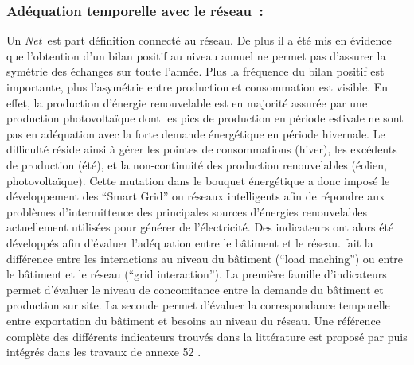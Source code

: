\subsubsection{Adéquation temporelle avec le réseau~:} %
\label{ssub:adequation_temporelle_avec_le_réseau}
Un \textit{Net}\, est part définition connecté au réseau. De plus il a été mis en évidence
que l’obtention d’un bilan positif au niveau annuel ne permet pas d’assurer la
symétrie des échanges sur toute l’année. Plus la fréquence du bilan positif est importante,
plus l’asymétrie entre production et consommation est visible. En effet, la production
d’énergie renouvelable est en majorité assurée par une production photovoltaïque
dont les pics de production en période estivale ne sont pas en adéquation avec la forte demande
énergétique en période hivernale. Le difficulté réside ainsi à gérer les pointes
de consommations (hiver), les excédents de production (été), et la non-continuité
des production renouvelables (éolien, photovoltaïque).
Cette mutation dans le bouquet énergétique a donc imposé le développement des
\enquote{Smart Grid} ou réseaux intelligents afin de répondre aux problèmes d’intermittence
des principales sources d’énergies renouvelables actuellement utilisées pour générer de
l’électricité. Des indicateurs ont alors été développés afin d’évaluer l’adéquation entre
le bâtiment et le réseau. \textcite{Voss2010} fait la différence entre les interactions au
niveau du bâtiment (\enquote{load maching}) ou entre le bâtiment et le réseau
(\enquote{grid interaction}). La première famille d’indicateurs permet d’évaluer le niveau
de concomitance entre la demande du bâtiment et production sur site. La seconde
permet d’évaluer la correspondance temporelle entre exportation du bâtiment et besoins au niveau du
réseau. Une référence complète des différents indicateurs trouvés dans la littérature est
proposé par \textcite{Salom2011} puis intégrés dans les travaux de annexe 52
\parencite{Salom2014}.


